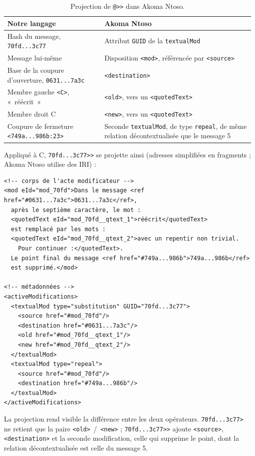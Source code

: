 \documentclass[11pt,a4paper]{article}
\newcommand{\cd}[1]{\texttt{#1}}
\begin{document}
\begin{table}[H]
\centering
\begin{tabularx}{\linewidth}{@{}LL@{}}
\toprule
Notre langage & Akoma Ntoso \\
\midrule
Hash du message, \cd{70fd...3c77} & Attribut \cd{GUID} de la \cd{textualMod} \\
Message lui-même & Disposition \cd{<mod>}, référencée par \cd{<source>} \\
Base de la coupure d'ouverture, \cd{0631...7a3c} & \cd{<destination>} \\
Membre gauche \cd{<C>}, «~réécrit~» & \cd{<old>}, vers un \cd{<quotedText>} \\
Membre droit C & \cd{<new>}, vers un \cd{<quotedText>} \\
Coupure de fermeture \cd{<749a...986b:23>} & Seconde \cd{textualMod}, de type \cd{repeal}, de même relation décontextualisée que le message 5 \\
\bottomrule
\end{tabularx}
\caption{Projection de \texttt{@>{}>} dans Akoma Ntoso.}
\end{table}

Appliqué à C, \cd{70fd...3c77>{}>} se projette ainsi (adresses simplifiées en fragments ; Akoma Ntoso utilise des IRI) :

\begin{Verbatim}[fontsize=\footnotesize]
<!-- corps de l'acte modificateur -->
<mod eId="mod_70fd">Dans le message <ref href="#0631...7a3c">0631...7a3c</ref>,
  après le septième caractère, le mot :
  <quotedText eId="mod_70fd__qtext_1">réécrit</quotedText>
  est remplacé par les mots :
  <quotedText eId="mod_70fd__qtext_2">avec un repentir non trivial.
    Pour continuer :</quotedText>.
  Le point final du message <ref href="#749a...986b">749a...986b</ref>
  est supprimé.</mod>

<!-- métadonnées -->
<activeModifications>
  <textualMod type="substitution" GUID="70fd...3c77">
    <source href="#mod_70fd"/>
    <destination href="#0631...7a3c"/>
    <old href="#mod_70fd__qtext_1"/>
    <new href="#mod_70fd__qtext_2"/>
  </textualMod>
  <textualMod type="repeal">
    <source href="#mod_70fd"/>
    <destination href="#749a...986b"/>
  </textualMod>
</activeModifications>
\end{Verbatim}

La projection rend visible la différence entre les deux opérateurs. \cd{70fd...3c77>} ne retient que la paire \cd{<old>}~/~\cd{<new>} ; \cd{70fd...3c77>{}>} ajoute \cd{<source>}, \cd{<destination>} et la seconde modification, celle qui supprime le point, dont la relation décontextualisée est celle du message 5.
\end{document}
